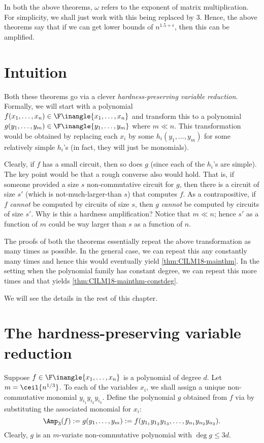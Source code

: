 In both the above theorems, $\omega$ refers to the exponent of matrix multiplication. For simplicity, we shall just work with this being replaced by $3$. Hence, the above theorems say that if we can get lower bounds of $n^{1.5 + \epsilon}$, then this can be amplified.

\section{Intuition}

Both these theorems go via a clever \emph{hardness-preserving variable reduction}. Formally, we will start with a polynomial $f(x_1,\ldots, x_n) \in \F\inangle{x_1,\ldots, x_n}$ and transform this to a polynomial $g(y_1,\ldots, y_m) \in \F\inangle{y_1,\ldots, y_m}$  where $m \ll n$. This transformation would be obtained by replacing each $x_i$ by some $h_i(y_1,\ldots, y_m)$ for some relatively simple $h_i$'s (in fact, they will just be monomials).

Clearly, if $f$ has a small circuit, then so does $g$ (since each of the $h_i$'s are simple). The key point would be that a rough converse also would hold. That is, if someone provided a size $s$ non-commutative circuit for $g$, then there is a circuit of size $s'$ (which is not-much-larger-than $s$) that computes $f$. As a contrapositive, if $f$ \emph{cannot} be computed by circuits of size $s$, then $g$ \emph{cannot} be computed by circuits of size $s'$. Why is this a hardness amplification? Notice that $m \ll n$; hence $s'$ as a function of $m$ could be way larger than $s$ as a function of $n$.

The proofs of both the theorems essentially repeat the above transformation as many times as possible. In the general case, we can repeat this any constantly many times and hence this would eventually yield \autoref{thm:CILM18-mainthm}. In the setting when the polynomial family has constant degree, we can repeat this more times and that yields \autoref{thm:CILM18-mainthm-constdeg}.

We will see the details in the rest of this chapter.

\section{The hardness-preserving variable reduction}

Suppose $f \in \F\inangle{x_1,\ldots, x_n}$ is a polynomial of degree $d$. Let $m = \ceil{n^{1/3}}$. To each of the variables $x_i$, we shall assign a unique non-commutative monomial $y_{i_1}y_{i_2}y_{i_3}$. Define the polynomial $g$ obtained from $f$ via by substituting the associated monomial for $x_i$:
\[
\Amp_3(f) :=  g(y_1,\dots, y_m) := f(y_{1_1}y_{1_2}y_{1_3}, \ldots, y_{n_1}y_{n_2}y_{n_3}).
\]
Clearly, $g$ is an $m$-variate non-commutative polynomial with  $\deg g \leq 3 d$.

